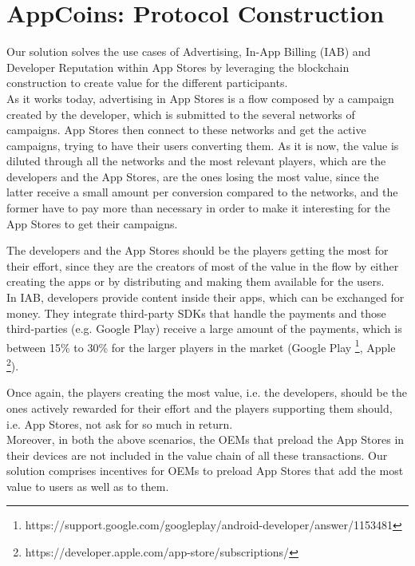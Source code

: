 \section{AppCoins: Protocol Construction}

Our solution solves the use cases of Advertising, In-App Billing (IAB) and Developer Reputation within App Stores by leveraging the blockchain construction to create value for the different participants.\\

As it works today, advertising in App Stores is a flow composed by a campaign created by the developer, which is submitted to the several networks of campaigns. App Stores then connect to these networks and get the active campaigns, trying to have their users converting them. As it is now, the value is diluted through all the networks and the most relevant players, which are the developers and the App Stores, are the ones losing the most value, since the latter receive a small amount per conversion compared to the networks, and the former have to pay more than necessary in order to make it interesting for the App Stores to get their campaigns.

The developers and the App Stores should be the players getting the most for their effort, since they are the creators of most of the value in the flow by either creating the apps or by distributing and making them available for the users.\\

In IAB, developers provide content inside their apps, which can be exchanged for money. They integrate third-party SDKs that handle the payments and those third-parties (e.g. Google Play) receive a large amount of the payments, which is between 15\% to 30\% for the larger players in the market (Google Play \footnote{https://support.google.com/googleplay/android-developer/answer/1153481}, Apple \footnote{https://developer.apple.com/app-store/subscriptions/}).

Once again, the players creating the most value, i.e. the developers, should be the ones actively rewarded for their effort and the players supporting them should, i.e. App Stores, not ask for so much in return.\\

Moreover, in both the above scenarios, the OEMs that preload the App Stores in their devices are not included in the value chain of all these transactions. Our solution comprises incentives for OEMs to preload App Stores that add the most value to users as well as to them.\\

